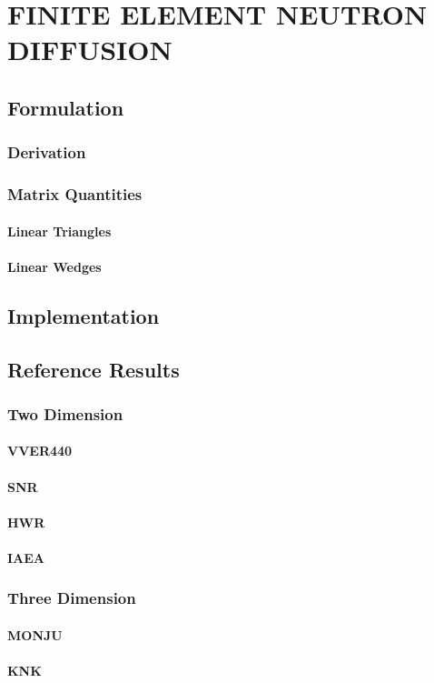 \chapter{FINITE ELEMENT NEUTRON DIFFUSION}
\label{ch:neutronDiffusion}

\section{Formulation}
  \subsection{Derivation}
  \subsection{Matrix Quantities}
    \subsubsection{Linear Triangles}
    \subsubsection{Linear Wedges}

\section{Implementation}

\section{Reference Results}
  \subsection{Two Dimension}
    \subsubsection{VVER440}
    \subsubsection{SNR}
    \subsubsection{HWR}
    \subsubsection{IAEA}
  \subsection{Three Dimension}
    \subsubsection{MONJU}
    \subsubsection{KNK}
